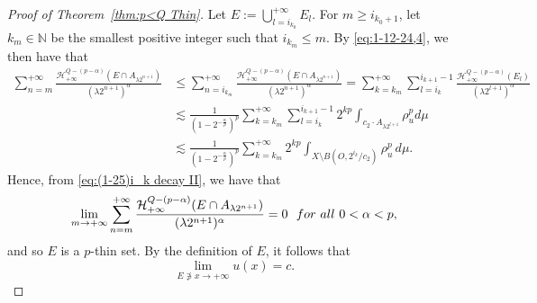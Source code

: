 \documentclass[10pt]{amsart}
\numberwithin{equation}{section}
\newcommand{\N}{\mathbb{N}}
\newcommand{\Ha}{\mathcal{H}}
\begin{document}
\begin{proof}[Proof of Theorem~\ref{thm:p<Q Thin}]
    Let $E:=\bigcup_{l=i_{k_0}}^{+\infty}E_{l}$.  For $m\ge i_{k_0+1}$, let $k_m\in\N$ be the smallest positive integer such that $i_{k_m}\le m$.  By \eqref{eq:1-12-24,4}, we then have 
    that 
    \begin{align*}
        \sum_{n=m}^{+\infty}\frac{\Ha^{Q-(p-\alpha)}_{+\infty}(E\cap A_{\lambda 2^{n+1}})}{(\lambda 2^{n+1})^\alpha}&\le\sum_{n=i_{k_m}}^{+\infty}\frac{\Ha^{Q-(p-\alpha)}_{+\infty}(E\cap A_{\lambda 2^{n+1}})}{(\lambda 2^{n+1})^\alpha}=\sum_{k=k_m}^{+\infty}\sum_{l=i_{k}}^{i_{k+1}-1}\frac{\Ha^{Q-(p-\alpha)}_{+\infty}(E_l)}{(\lambda 2^{l+1})^\alpha}\\
        &\lesssim\frac{1}{(1-2^{-\frac{\alpha}{p}})^p} \sum_{k=k_m}^{+\infty}\sum_{l=i_{k}}^{i_{k+1}-1}2^{kp}\int_{c_2\cdot A_{\lambda 2^{l+1}}}\rho_u^pd\mu\\
        &\lesssim \frac{1}{(1-2^{-\frac{\alpha}{p}})^p} \sum_{k=k_m}^{+\infty}2^{kp}\int_{X\setminus B(O,2^{i_k}/c_2)}\rho_u^p\,d\mu.
    \end{align*}
    Hence, from \eqref{eq:(1-25)i_k decay II}, we have that 
    \[
    \lim_{m\to+\infty}\sum_{n=m}^{+\infty}\frac{\Ha^{Q-(p-\alpha)}_{+\infty}(E\cap A_{\lambda 2^{n+1}})}{(\lambda 2^{n+1})^\alpha}=0 {\rm \ \ for\ all\ 0<\alpha<p},
    \]
    and so $E$ is a $p$-thin set.  By the definition of $E$,  it follows that 
    \[
    \lim_{E\not\ni x\to+\infty}u(x)=c.
    \]  

    
    
    





    


\end{proof}
\end{document}
